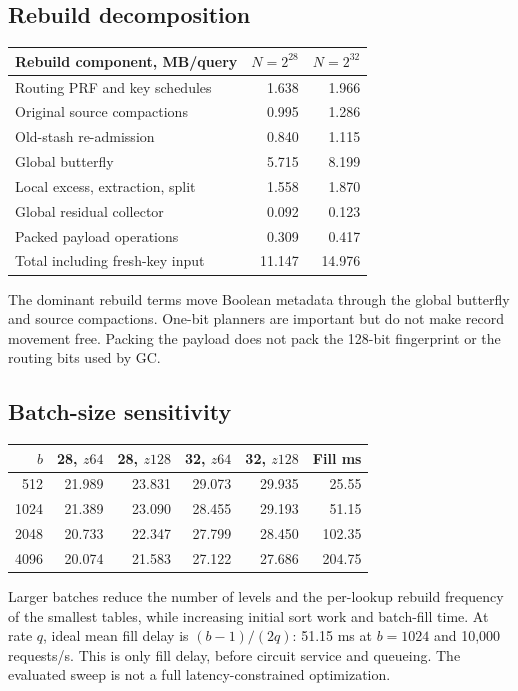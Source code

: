 \documentclass[11pt]{article}
\begin{document}
\subsection{Rebuild decomposition}
\begin{center}\small
\begin{tabular}{lrr}\toprule
Rebuild component, MB/query & $N=2^{28}$ & $N=2^{32}$\\\midrule
Routing PRF and key schedules & 1.638 & 1.966\\
Original source compactions & 0.995 & 1.286\\
Old-stash re-admission & 0.840 & 1.115\\
Global butterfly & 5.715 & 8.199\\
Local excess, extraction, split & 1.558 & 1.870\\
Global residual collector & 0.092 & 0.123\\
Packed payload operations & 0.309 & 0.417\\
Total including fresh-key input & 11.147 & 14.976\\
\bottomrule\end{tabular}\end{center}
The dominant rebuild terms move Boolean metadata through the global
butterfly and source compactions. One-bit planners are important but do not
make record movement free. Packing the payload does not pack the 128-bit
fingerprint or the routing bits used by GC.

\subsection{Batch-size sensitivity}
\begin{center}\small
\begin{tabular}{rrrrrr}\toprule
$b$ & 28, $z64$ & 28, $z128$ & 32, $z64$ & 32, $z128$ & Fill ms\\\midrule
512 & 21.989 & 23.831 & 29.073 & 29.935 & 25.55\\
1024 & 21.389 & 23.090 & 28.455 & 29.193 & 51.15\\
2048 & 20.733 & 22.347 & 27.799 & 28.450 & 102.35\\
4096 & 20.074 & 21.583 & 27.122 & 27.686 & 204.75\\
\bottomrule\end{tabular}\end{center}
Larger batches reduce the number of levels and the per-lookup rebuild
frequency of the smallest tables, while increasing initial sort work and
batch-fill time. At rate $q$, ideal mean fill delay is $(b-1)/(2q)$:
51.15 ms at $b=1024$ and 10,000 requests/s. This is only fill delay,
before circuit service and queueing. The evaluated sweep is not a full
latency-constrained optimization.
\end{document}
